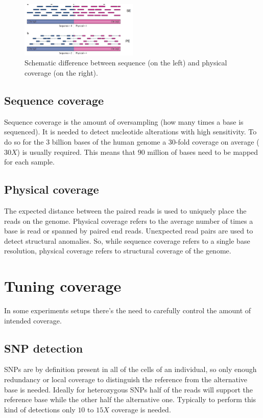 \begin{figure}[H]
    \centering
    \includegraphics[width=0.5\textwidth]{seq_phys.png}
    \caption{Schematic difference between sequence (on the left) and physical coverage (on the right).}
    \label{fig:seq_phys}
\end{figure}

    \subsection{Sequence coverage}
    Sequence coverage is the amount of oversampling (how many times a base is sequenced).
    It is needed to detect nucleotide alterations with high sensitivity.
    To do so for the 3 billion bases of the human genome a $30$-fold coverage on average ($30X$) is usually required.
    This means that $90$ million of bases need to be mapped for each sample.

    \subsection{Physical coverage}
		The expected distance between the paired reads is used to uniquely place the reads on the genome.
    Physical coverage refers to the average number of times a base is read or spanned by paired end reads.
    Unexpected read pairs are used to detect structural anomalies.
    So, while sequence coverage refers to a single base resolution, physical coverage refers to structural coverage of the genome.

\section{Tuning coverage}
In some experiments setups there's the need to carefully control the amount of intended coverage.

    \subsection{SNP detection}
    SNPs are by definition present in all of the cells of an individual, so only enough redundancy or local coverage to distinguish the reference from the alternative base is needed.
    Ideally for heterozygous SNPs half of the reads will support the reference base while the other half the alternative one.
    Typically to perform this kind of detections only $10$ to $15X$ coverage is needed.

